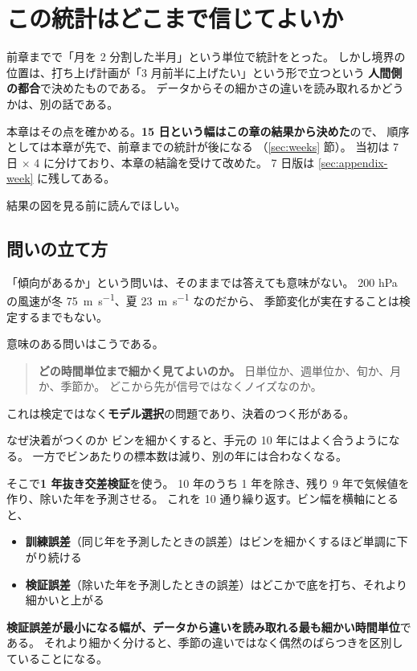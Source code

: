 \section{この統計はどこまで信じてよいか}
\label{sec:validation}

前章までで「月を 2 分割した半月」という単位で統計をとった。
しかし境界の位置は、打ち上げ計画が「3 月前半に上げたい」という形で立つという
\textbf{人間側の都合}で決めたものである。
データからその細かさの違いを読み取れるかどうかは、別の話である。

本章はその点を確かめる。\textbf{15 日という幅はこの章の結果から決めた}ので、
順序としては本章が先で、前章までの統計が後になる
（\ref{sec:weeks} 節）。
当初は 7 日 $\times$ 4 に分けており、本章の結論を受けて改めた。
7 日版は \ref{sec:appendix-week} に残してある。

結果の図を見る前に読んでほしい。

\subsection{問いの立て方}

「傾向があるか」という問いは、そのままでは答えても意味がない。
200 hPa の風速が冬 \SI{75}{\metre\per\second}、夏 \SI{23}{\metre\per\second} なのだから、
季節変化が実在することは検定するまでもない。

意味のある問いはこうである。

\begin{quote}
\textbf{どの時間単位まで細かく見てよいのか。}
日単位か、週単位か、旬か、月か、季節か。
どこから先が信号ではなくノイズなのか。
\end{quote}

これは検定ではなく\textbf{モデル選択}の問題であり、決着のつく形がある。

\begin{whybox}{なぜ決着がつくのか}
ビンを細かくすると、手元の 10 年にはよく合うようになる。
一方でビンあたりの標本数は減り、別の年には合わなくなる。

そこで\textbf{1 年抜き交差検証}を使う。
10 年のうち 1 年を除き、残り 9 年で気候値を作り、除いた年を予測させる。
これを 10 通り繰り返す。ビン幅を横軸にとると、

\begin{itemize}
  \item \textbf{訓練誤差}（同じ年を予測したときの誤差）はビンを細かくするほど単調に下がり続ける
  \item \textbf{検証誤差}（除いた年を予測したときの誤差）はどこかで底を打ち、それより細かいと上がる
\end{itemize}

\textbf{検証誤差が最小になる幅が、データから違いを読み取れる最も細かい時間単位}である。
それより細かく分けると、季節の違いではなく偶然のばらつきを区別していることになる。
\end{whybox}

